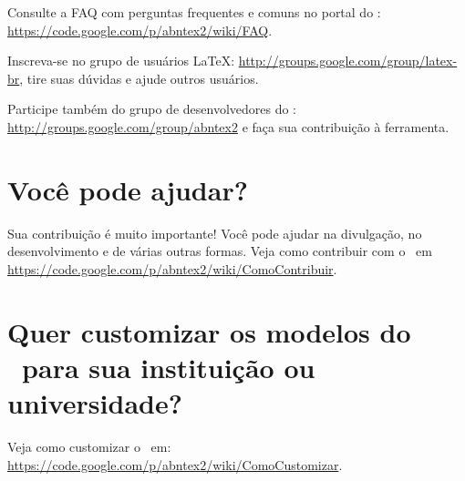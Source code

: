 Consulte a FAQ com perguntas frequentes e comuns no portal do \abnTeX:
\url{https://code.google.com/p/abntex2/wiki/FAQ}.

Inscreva-se no grupo de usuários \LaTeX:
\url{http://groups.google.com/group/latex-br}, tire suas dúvidas e ajude
outros usuários.

Participe também do grupo de desenvolvedores do \abnTeX:
\url{http://groups.google.com/group/abntex2} e faça sua contribuição à
ferramenta.

\section{Você pode ajudar?}

Sua contribuição é muito importante! Você pode ajudar na divulgação, no
desenvolvimento e de várias outras formas. Veja como contribuir com o \abnTeX\
em \url{https://code.google.com/p/abntex2/wiki/ComoContribuir}.

\section{Quer customizar os modelos do \abnTeX\ para sua instituição ou
universidade?}

Veja como customizar o \abnTeX\ em:
\url{https://code.google.com/p/abntex2/wiki/ComoCustomizar}.

